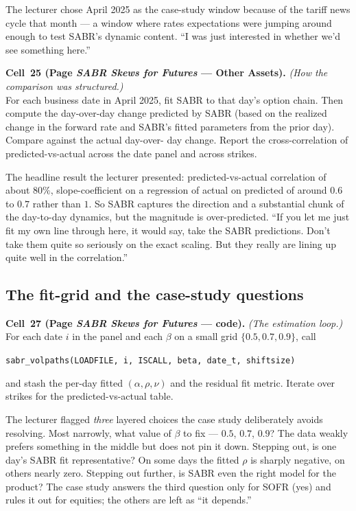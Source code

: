 The lecturer chose April 2025 as the case-study window because of
the tariff news cycle that month --- a window where rates
expectations were jumping around enough to test SABR's dynamic
content. ``I was just interested in whether we'd see something
here.''

\begin{keyblock}
\textbf{Cell~25 (Page \emph{SABR Skews for Futures} --- Other Assets).}
\emph{(How the comparison was structured.)}\\
For each business date in April 2025, fit SABR to that day's option
chain. Then compute the day-over-day change predicted by SABR
(based on the realized change in the forward rate and SABR's fitted
parameters from the prior day). Compare against the actual day-over-
day change. Report the cross-correlation of predicted-vs-actual
across the date panel and across strikes.
\end{keyblock}

The headline result the lecturer presented: predicted-vs-actual
correlation of about $80\%$, slope-coefficient on a regression of
actual on predicted of around $0.6$ to $0.7$ rather than $1$. So
SABR captures the direction and a substantial chunk of the day-to-day
dynamics, but the magnitude is over-predicted. ``If you let me just
fit my own line through here, it would say, take the SABR
predictions. Don't take them quite so seriously on the exact
scaling. But they really are lining up quite well in the
correlation.''

\subsection{The fit-grid and the case-study questions}\label{L8-sec:fitgrid}

\begin{keyblock}
\textbf{Cell~27 (Page \emph{SABR Skews for Futures} --- code).}
\emph{(The estimation loop.)}\\
For each date $i$ in the panel and each $\beta$ on a small grid
$\{0.5, 0.7, 0.9\}$, call
\begin{center}
\texttt{sabr\_volpaths(LOADFILE, i, ISCALL, beta, date\_t, shiftsize)}
\end{center}
and stash the per-day fitted $(\alpha, \rho, \nu)$ and the residual
fit metric. Iterate over strikes for the predicted-vs-actual table.
\end{keyblock}

The lecturer flagged \emph{three} layered choices the case study
deliberately avoids resolving. Most narrowly, what value of $\beta$
to fix --- $0.5$, $0.7$, $0.9$? The data weakly prefers something in
the middle but does not pin it down. Stepping out, is one day's
SABR fit representative? On some days the fitted $\rho$ is sharply
negative, on others nearly zero. Stepping out further, is SABR even
the right model for the product? The case study answers the third
question only for SOFR (yes) and rules it out for equities; the
others are left as ``it depends.''

